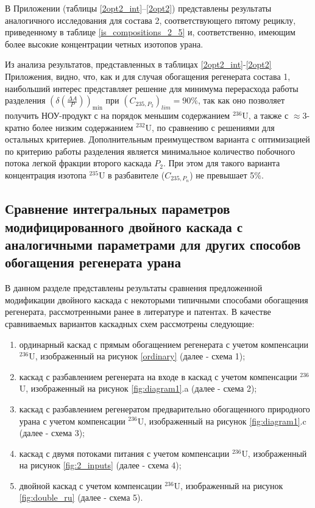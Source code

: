 В Приложении (таблицы \ref{2opt2_int}--\ref{2opt2}) представлены результаты аналогичного исследования для состава 2, соответствующего пятому рециклу, приведенному в таблице \ref{is_compositions_2_5} и, соответственно, имеющим более высокие концентрации четных изотопов урана.


Из анализа результатов, представленных в таблицах \ref{2opt2_int}-\ref{2opt2} Приложения, видно, что, как и для случая обогащения регенерата состава 1, наибольший интерес представляет решение для минимума перерасхода работы разделения $(\delta(\frac{\Delta A}{P}))_\text{min}$ при $({C_{235,{P_2}}})_{lim}=90\%$, так как оно позволяет получить НОУ-продукт с на порядок меньшим содержанием $^{236}$U, а также с $\approx$3-кратно более низким содержанием $^{232}$U, по сравнению с решениями для остальных критериев.
Дополнительным преимуществом варианта с оптимизацией по критерию работы разделения является минимальное количество побочного потока легкой фракции второго каскада $P_2$. 
При этом для такого варианта концентрация изотопа $^{235}$U в разбавителе ($C_{235,P_{n}}$) не превышает 5\%.

\subsection{Сравнение интегральных параметров модифицированного двойного каскада с аналогичными параметрами для других способов обогащения регенерата урана}\label{integral_comp}

В данном разделе представлены результаты сравнения предложенной модификации двойного каскада с некоторыми типичными способами обогащения регенерата, рассмотренными ранее в литературе и патентах. В качестве сравниваемых вариантов каскадных схем рассмотрены следующие: 

\begin{enumerate}
    \item ординарный каскад с прямым обогащением регенерата с учетом компенсации $^{236}$U, изображенный на рисунок \ref{ordinary} (далее - схема 1);
    \item каскад с разбавлением регенерата на входе в каскад с учетом компенсации $^{236}$U, изображенный на рисунок \ref{fig:diagram1}.a (далее - схема 2);
    \item каскад с разбавлением регенератом предварительно обогащенного природного урана с учетом компенсации $^{236}$U, изображенный на рисунок \ref{fig:diagram1}.c (далее - схема 3);
    \item каскад с двумя потоками питания с учетом компенсации $^{236}$U, изображенный на рисунок \ref{fig:2_inputs} (далее - схема 4);
    \item двойной каскад с учетом компенсации $^{236}$U, изображенный на рисунок \ref{fig:double_ru} (далее - схема 5).
\end{enumerate}

